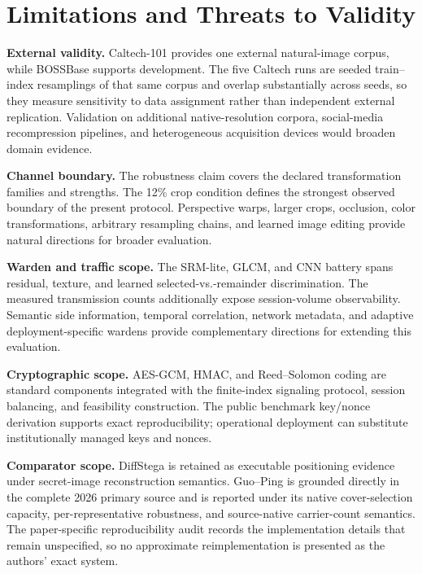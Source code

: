 \section{Limitations and Threats to Validity}
\textbf{External validity.} Caltech-101 provides one external natural-image corpus, while BOSSBase supports development. The five Caltech runs are seeded train--index resamplings of that same corpus and overlap substantially across seeds, so they measure sensitivity to data assignment rather than independent external replication. Validation on additional native-resolution corpora, social-media recompression pipelines, and heterogeneous acquisition devices would broaden domain evidence.

\textbf{Channel boundary.} The robustness claim covers the declared transformation families and strengths. The 12\% crop condition defines the strongest observed boundary of the present protocol. Perspective warps, larger crops, occlusion, color transformations, arbitrary resampling chains, and learned image editing provide natural directions for broader evaluation.

\textbf{Warden and traffic scope.} The SRM-lite, GLCM, and CNN battery spans residual, texture, and learned selected-vs.-remainder discrimination. The measured transmission counts additionally expose session-volume observability. Semantic side information, temporal correlation, network metadata, and adaptive deployment-specific wardens provide complementary directions for extending this evaluation.

\textbf{Cryptographic scope.} AES-GCM, HMAC, and Reed--Solomon coding are standard components integrated with the finite-index signaling protocol, session balancing, and feasibility construction. The public benchmark key/nonce derivation supports exact reproducibility; operational deployment can substitute institutionally managed keys and nonces.

\textbf{Comparator scope.} DiffStega is retained as executable positioning evidence under secret-image reconstruction semantics. Guo--Ping is grounded directly in the complete 2026 primary source and is reported under its native cover-selection capacity, per-representative robustness, and source-native carrier-count semantics. The paper-specific reproducibility audit records the implementation details that remain unspecified, so no approximate reimplementation is presented as the authors' exact system.

